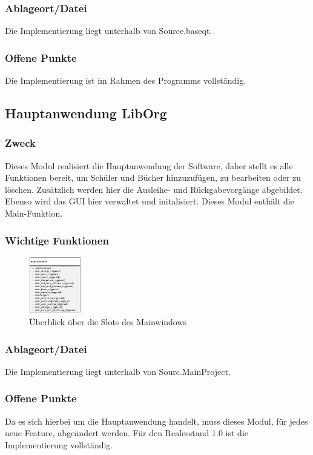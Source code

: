 \subsubsection{Ablageort/Datei}
Die Implementierung liegt unterhalb von Source.baseqt.
\subsubsection{Offene Punkte}
Die Implementierung ist im Rahmen des Programms vollständig.


\subsection{Hauptanwendung LibOrg}
\subsubsection{Zweck}
Dieses Modul realisiert die Hauptanwendung der Software, daher stellt es alle Funktionen 
bereit, um Schüler und Bücher hinzuzufügen, zu bearbeiten oder zu löschen. Zusätzlich 
werden hier die Ausleihe- und Rückgabevorgänge abgebildet. Ebenso wird das GUI hier 
verwaltet und initalisiert. Dieses Modul enthält die Main-Funktion.
\subsubsection{Wichtige Funktionen}
\begin{figure}[H]
	\centering
		\includegraphics[width=0.20\textwidth]{figures/Mainwindow.jpg}
	\caption{Überblick über die Slots des Mainwindows }
	\label{fig:LibOrg}
\end{figure}

\subsubsection{Ablageort/Datei}
Die Implementierung liegt unterhalb von Sourc.MainProject.
\subsubsection{Offene Punkte}
Da es sich hierbei um die Hauptanwendung handelt, muss dieses Modul, für jedes neue Feature,
abgeändert werden. Für den Realesstand 1.0 ist die Implementierung vollständig.